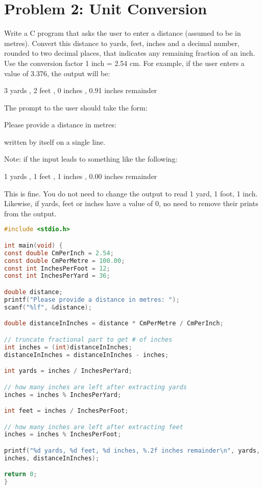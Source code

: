 \documentclass[12pt]{article}
\begin{document}
\section*{Problem 2: Unit Conversion}
Write a C program that asks the user to enter a distance (assumed to be in metres). Convert this distance to yards, feet, inches and a decimal number, rounded to two decimal places, that indicates any remaining fraction of an inch. Use the conversion factor 1 inch = 2.54 cm. For example, if the user enters a value of 3.376, the output will be:
\begin{tcolorbox}[colback=gray!10, boxrule=0pt, sharp corners, enhanced jigsaw, left=3mm, right=3mm, top=1mm, bottom=1mm]
3 yards , 2 feet , 0 inches , 0.91 inches remainder
\end{tcolorbox}
The prompt to the user should take the form:
\begin{tcolorbox}[colback=gray!10, boxrule=0pt, sharp corners, enhanced jigsaw, left=3mm, right=3mm, top=1mm, bottom=1mm]
Please provide a distance in metres:
\end{tcolorbox}
written by itself on a single line.

Note: if the input leads to something like the following:
\begin{tcolorbox}[colback=gray!10, boxrule=0pt, sharp corners, enhanced jigsaw, left=3mm, right=3mm, top=1mm, bottom=1mm]
	1 yards , 1 feet , 1 inches , 0.00 inches remainder
\end{tcolorbox}

This is fine. You do not need to change the output to read 1 yard, 1 foot, 1 inch. Likewise, if yards, feet or inches have a value of 0, no need to remove their prints from the output.

\begin{lstlisting}[language=C]
#include <stdio.h>

int main(void) {
const double CmPerInch = 2.54;
const double CmPerMetre = 100.00;
const int InchesPerFoot = 12;
const int InchesPerYard = 36;

double distance;
printf("Please provide a distance in metres: ");
scanf("%lf", &distance);

double distanceInInches = distance * CmPerMetre / CmPerInch;

// truncate fractional part to get # of inches
int inches = (int)distanceInInches;
distanceInInches = distanceInInches - inches;

int yards = inches / InchesPerYard;

// how many inches are left after extracting yards
inches = inches % InchesPerYard;

int feet = inches / InchesPerFoot;

// how many inches are left after extracting feet
inches = inches % InchesPerFoot;

printf("%d yards, %d feet, %d inches, %.2f inches remainder\n", yards, feet,
inches, distanceInInches);

return 0;
}

\end{lstlisting}
\end{document}
